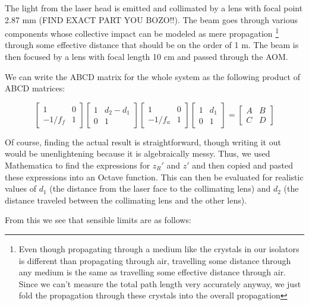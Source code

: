 The light from the laser head is emitted and collimated by a lens with focal point 2.87 mm (FIND EXACT PART YOU BOZO!!). The beam goes through various components whose collective impact can be modeled as mere propagation 
\footnote{Even though propagating through a medium like the crystals in our isolators is different than propagating through air, travelling some distance through any medium is the same as travelling some effective distance through air. Since we can't measure the total path length very accurately anyway, we just fold the propagation through these crystals into the overall propagation}
through some effective distance that should be on the order of 1 m. The beam is then focused by a lens with focal length 10 cm and passed through the AOM. 

We can write the ABCD matrix for the whole system as the following product of ABCD matrices: 

\begin{equation}
\begin{bmatrix}
1 & 0 \\ -1/f_{f} & 1
\end{bmatrix}
\begin{bmatrix}
1 & d_2-d_1 \\ 0 & 1
\end{bmatrix}
\begin{bmatrix}
1 & 0 \\ -1/f_{a} & 1
\end{bmatrix}
\begin{bmatrix}
1 & d_1 \\ 0 & 1
\end{bmatrix}
=
\begin{bmatrix}
A & B \\ C & D
\end{bmatrix}
\end{equation}

Of course, finding the actual result is straightforward, though writing it out would be unenlightening because it is algebraically messy. Thus, we used Mathematica to find the expressions for $z_R'$ and $z'$ and then copied and pasted these expressions into an Octave function. This can then be evaluated for realistic values of $d_1$ (the distance from the laser face to the collimating lens) and $d_2$ (the distance traveled between the collimating lens and the other lens). 

From this we see that sensible limits are as follows: 





